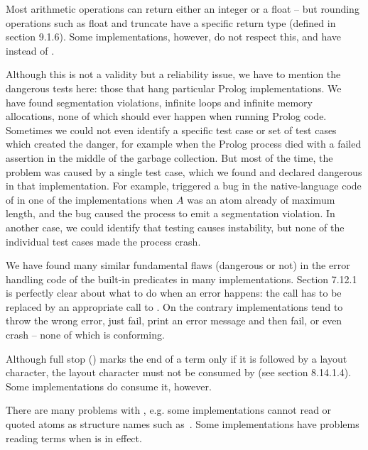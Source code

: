\documentclass[draft]{llncs}%
\begin{document}
Most arithmetic operations can return either an integer or a float -- but
rounding operations such as \textsf{float} and \textsf{truncate} have a
specific return type (defined in section 9.1.6). Some implementations,
however, do not respect this, and have  instead of
.

Although this is not a validity but a reliability issue, we have to mention
the dangerous tests here: those that hang particular Prolog implementations.
We have found segmentation violations, infinite loops and infinite memory
allocations, none of which should ever happen when running Prolog code.
Sometimes we could not even identify a specific test case or set of test cases
which created the danger, for example when the Prolog process died with a
failed assertion in the middle of the garbage collection. But most of the
time, the problem was caused by a single test case, which we found and
declared dangerous in that implementation. For example,
 triggered a bug
in the native-language code of  in
one of the implementations
when $A$ was an atom already of maximum length, and the bug
caused the process to emit a segmentation violation. In another case, we
could identify that testing  causes instability, but none
of the individual test cases made the process crash.

We have found many similar fundamental flaws (dangerous or not) in the
error handling code of the built-in predicates in many implementations.
Section 7.12.1 is perfectly clear about what to do when an error happens: the
call has to be replaced by an appropriate call to .
On the contrary implementations tend to throw the wrong error, just fail,
print an error message and then fail, or even crash -- none of which is
conforming.

Although full stop ()
marks the end of a term only if it is followed by a
layout character, the layout character must not be consumed by
 (see section 8.14.1.4). Some implementations do consume it,
however.

There are many problems with , e.g. some implementations
cannot read  or quoted atoms as structure names
such as \,.
Some implementations have problems reading terms when
 is in effect.
\end{document}
